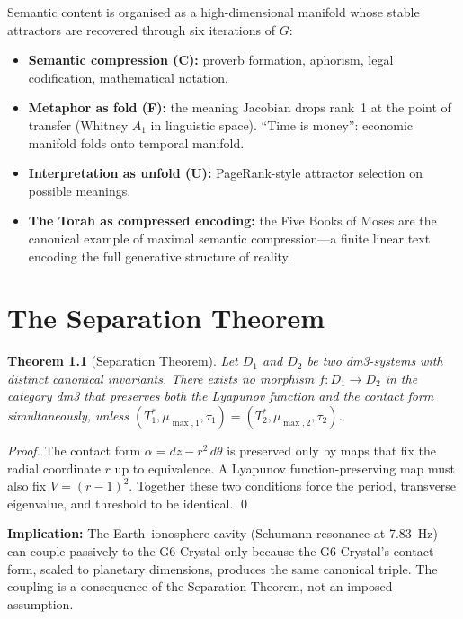\documentclass[11pt, twoside, openright]{book}
\theoremstyle{plain}
\newtheorem{theorem}{Theorem}[chapter]
\theoremstyle{definition}
\begin{document}
Semantic content is organised as a high-dimensional manifold whose
stable attractors are recovered through six iterations of $G$:
\begin{itemize}[leftmargin=*]
  \item \textbf{Semantic compression (C):} proverb formation, aphorism,
    legal codification, mathematical notation.
  \item \textbf{Metaphor as fold (F):} the meaning Jacobian drops
    rank~1 at the point of transfer (Whitney $A_1$ in linguistic space).
    ``Time is money'': economic manifold folds onto temporal manifold.
  \item \textbf{Interpretation as unfold (U):} PageRank-style attractor
    selection on possible meanings.
  \item \textbf{The Torah as compressed encoding:} the Five Books of
    Moses are the canonical example of maximal semantic compression---a
    finite linear text encoding the full generative structure of reality.
\end{itemize}

\chapter{The Separation Theorem}

\begin{theorem}[Separation Theorem]
Let $D_1$ and $D_2$ be two dm3-systems with distinct canonical
invariants. There exists no morphism $f : D_1 \to D_2$ in the category
dm3 that preserves both the Lyapunov function and the contact form
simultaneously, unless
$(T^*_1, \mu_{\max,1}, \tau_1) = (T^*_2, \mu_{\max,2}, \tau_2)$.
\end{theorem}

\begin{proof}
The contact form $\alpha = dz - r^2\,d\theta$ is preserved only by maps
that fix the radial coordinate $r$ up to equivalence. A Lyapunov
function-preserving map must also fix $V = (r-1)^2$. Together these
two conditions force the period, transverse eigenvalue, and threshold
to be identical. \qed
\end{proof}

\textbf{Implication:} The Earth--ionosphere cavity (Schumann resonance
at 7.83~Hz) can couple passively to the G6 Crystal only because the
G6 Crystal's contact form, scaled to planetary dimensions, produces
the same canonical triple. The coupling is a consequence of the
Separation Theorem, not an imposed assumption.
\end{document}
